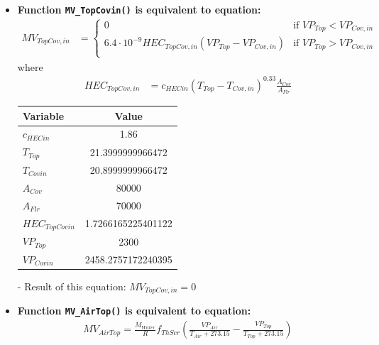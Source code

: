 \documentclass[a4paper]{article}
\numberwithin{equation}{section}
\begin{document}
\begin{itemize}
  \item \textbf{Function \texttt{MV\_TopCovin()} is equivalent to equation:}
        \begin{align*}
          MV_{TopCov,in} & = \begin{cases}
            0                                                         & \text{if~} VP_{Top} < VP_{Cov,in} \\
            6.4 \cdot 10^{-9} HEC_{TopCov,in}(VP_{Top} - VP_{Cov,in}) & \text{if~} VP_{Top} > VP_{Cov,in} \\
          \end{cases}
        \end{align*}
        where
        \begin{align*}
          HEC_{TopCov,in} & = {c_{HECin} (T_{Top} - T_{Cov,in})}^{0.33} \frac{A_{Cov}}{A_{Flr}}
        \end{align*}

        \begin{table}[H]
          \centering
          \begin{tabular}{@{}lS[table-format=4.17]@{}}
            \toprule
            \textbf{Variable}  & \textbf{Value}     \\
            \midrule
            \(c_{HECin}\)      & 1.86               \\
            \(T_{Top}\)        & 21.3999999966472   \\
            \(T_{Covin}\)      & 20.8999999966472   \\
            \(A_{Cov}\)        & 80000              \\
            \(A_{Flr}\)        & 70000              \\
            \(HEC_{TopCovin}\) & 1.7266165225401122 \\
            \(VP_{Top}\)       & 2300               \\
            \(VP_{Covin}\)     & 2458.2757172240395 \\
            \bottomrule
          \end{tabular}
        \end{table}

  \item[-] Result of this equation: \(MV_{TopCov,in} = 0\)

  \item \textbf{Function \texttt{MV\_AirTop()} is equivalent to equation:}
        \begin{align*}
          MV_{AirTop}  = \frac{M_{Water}}{R} f_{ThScr} (\frac{VP_{Air}}{T_{Air} + 273.15} - \frac{VP_{Top}}{T_{Top} + 273.15})
        \end{align*}


\end{itemize}
\end{document}
